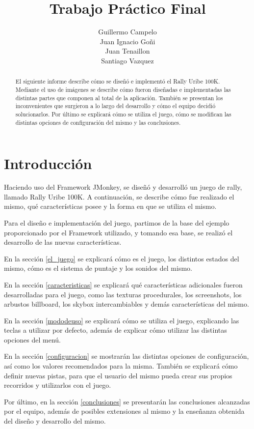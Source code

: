 \documentclass[a4paper,11pt]{article}
\title{Trabajo Práctico Final}
\author{Guillermo Campelo\\Juan Ignacio Goñi\\Juan
Tenaillon\\Santiago Vazquez}
\begin{document}
\maketitle

\begin{abstract}
El siguiente informe describe cómo se diseñó e implementó el Rally Uribe 100K. 
Mediante el uso de imágenes se describe cómo fueron diseñadas e implementadas
las distintas partes que componen al total de la aplicación.  También se
presentan los inconvenientes que surgieron a lo largo del desarrollo y cómo el
equipo decidió solucionarlos.  Por último se explicará cómo se utiliza el juego,
cómo se modifican las distintas opciones de configuración del mismo y las
conclusiones.
\end{abstract}

\section{Introducción}

Haciendo uso del Framework JMonkey, se diseñó y desarrolló un juego de rally,
llamado Rally Uribe 100K.  A continuación, se describe cómo fue realizado el
mismo, qué características posee y la forma en que se utiliza el mismo.

Para el diseño e implementación del juego, partimos de la base del ejemplo
proporcionado por el Framework utilizado, y tomando esa base, se realizó
el desarrollo de las nuevas características.

En la sección \ref{el_juego} se explicará cómo es el juego, los distintos
estados del mismo, cómo es el sistema de puntaje y los sonidos del mismo.

En la sección \ref{caracteristicas} se explicará qué características
adicionales fueron desarrolladas para el juego, como las texturas procedurales,
los screenshots, los arbustos billboard, los skybox intercambiables y demás
características del mismo.

En la sección \ref{mododeuso} se explicará cómo se utiliza el juego, explicando
las teclas a utilizar por defecto, además de explicar cómo utilizar las
distintas opciones del menú.

En la sección \ref{configuracion} se mostrarán las distintas opciones de
configuración, así como los valores recomendados para la misma.  También se
explicará cómo definir nuevas pistas, para que el usuario del mismo pueda crear
sus propios recorridos y utilizarlos con el juego.

Por último, en la sección \ref{conclusiones} se presentarán las conclusiones
alcanzadas por el equipo, además de posibles extensiones al mismo y la
enseñanza obtenida del diseño y desarrollo del mismo.
\end{document}
